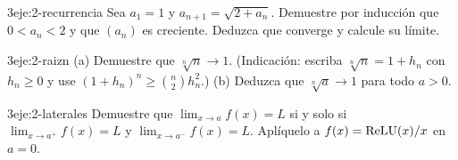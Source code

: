 \begin{ejercicio}{3}{eje:2-recurrencia}
Sea $a_1=1$ y $a_{n+1}=\sqrt{2+a_n}$. Demuestre por inducción que $0<a_n<2$ y que $(a_n)$ es creciente. Deduzca que converge y calcule su límite.
\end{ejercicio}

\begin{ejercicio}{3}{eje:2-raizn}
(a) Demuestre que $\sqrt[n]{n}\to1$. (Indicación: escriba $\sqrt[n]{n}=1+h_n$ con $h_n\ge0$ y use $(1+h_n)^{n}\ge\binom n2h_n^{2}$.) (b) Deduzca que $\sqrt[n]{a}\to1$ para todo $a>0$.
\end{ejercicio}

\begin{ejercicio}{3}{eje:2-laterales}
Demuestre que $\lim_{x\to a}f(x)=L$ si y solo si $\lim_{x\to a^{+}}f(x)=L$ y $\lim_{x\to a^{-}}f(x)=L$. Aplíquelo a $f(x)=\operatorname{ReLU}(x)/x$ en $a=0$.
\end{ejercicio}
